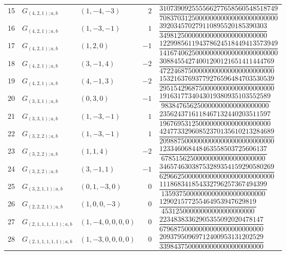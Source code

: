 \documentclass[11pt]{article}
\begin{document}
\begin{longtable}{@{}rllrl@{}}
15 & \(G_{(4,2,1);a,b}\) & \((1,-4,-3)\) & \(2\) & \(\dfrac{310739092555566277658560548518749}{708370312500000000000000000000000}\) \\[6pt]
16 & \(G_{(4,2,1);a,b}\) & \((1,-3,-1)\) & \(1\) & \(\dfrac{392034570279110895520185390303}{349812500000000000000000000000}\) \\[6pt]
17 & \(G_{(4,2,1);a,b}\) & \((1,2,0)\) & \(-1\) & \(\dfrac{122998561194378624518449413573949}{141674062500000000000000000000000}\) \\[6pt]
18 & \(G_{(4,2,1);a,b}\) & \((3,-1,4)\) & \(-2\) & \(\dfrac{30884554274001200121651411444769}{47224687500000000000000000000000}\) \\[6pt]
19 & \(G_{(4,2,1);a,b}\) & \((4,-1,3)\) & \(-2\) & \(\dfrac{15321637693779276596484703530539}{29515429687500000000000000000000}\) \\[6pt]
20 & \(G_{(3,3,1);a,b}\) & \((0,3,0)\) & \(-1\) & \(\dfrac{1916317734043019380935103552589}{983847656250000000000000000000}\) \\[6pt]
21 & \(G_{(3,3,1);a,b}\) & \((1,-3,-1)\) & \(1\) & \(\dfrac{2356243716118467132440203511597}{1967695312500000000000000000000}\) \\[6pt]
22 & \(G_{(3,2,2);a,b}\) & \((1,-3,-1)\) & \(1\) & \(\dfrac{42477332960852370135610213284689}{20988750000000000000000000000000}\) \\[6pt]
23 & \(G_{(3,2,2);a,b}\) & \((1,1,4)\) & \(-2\) & \(\dfrac{123346068448463558503725606137}{67851562500000000000000000000}\) \\[6pt]
24 & \(G_{(3,2,2);a,b}\) & \((3,-1,1)\) & \(-1\) & \(\dfrac{34657463038753289354159290580269}{62966250000000000000000000000000}\) \\[6pt]
25 & \(G_{(3,2,1,1);a,b}\) & \((0,1,-3,0)\) & \(0\) & \(\dfrac{111868341854332796257367494399}{13593750000000000000000000000}\) \\[6pt]
26 & \(G_{(2,2,2,1);a,b}\) & \((1,0,0,-3)\) & \(0\) & \(\dfrac{129021577255464953947629819}{45312500000000000000000000}\) \\[6pt]
27 & \(G_{(2,1,1,1,1,1);a,b}\) & \((1,-4,0,0,0,0)\) & \(0\) & \(\dfrac{22348383362905355092020478147}{67968750000000000000000000000}\) \\[6pt]
28 & \(G_{(2,1,1,1,1,1);a,b}\) & \((1,-3,0,0,0,0)\) & \(0\) & \(\dfrac{20937950969712400953131202529}{33984375000000000000000000000}\) \\[6pt]
\end{longtable}
\endgroup
\end{document}
